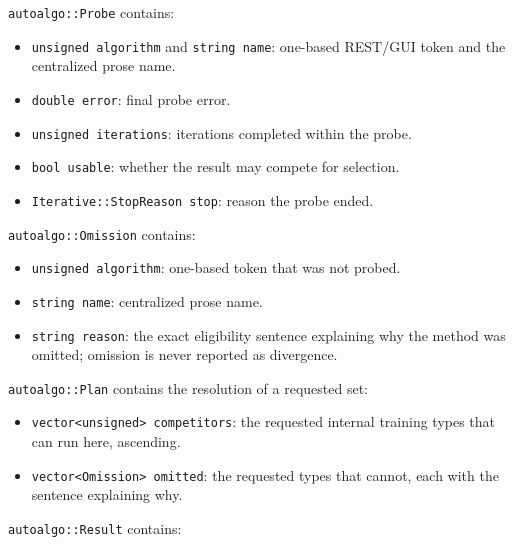 \texttt{autoalgo::Probe} contains:

\begin{itemize}
\item \texttt{unsigned algorithm} and \texttt{string name}: one-based REST/GUI
      token and the centralized prose name.
\item \texttt{double error}: final probe error.
\item \texttt{unsigned iterations}: iterations completed within the probe.
\item \texttt{bool usable}: whether the result may compete for selection.
\item \texttt{Iterative::StopReason stop}: reason the probe ended.
\end{itemize}

\texttt{autoalgo::Omission} contains:

\begin{itemize}
\item \texttt{unsigned algorithm}: one-based token that was not probed.
\item \texttt{string name}: centralized prose name.
\item \texttt{string reason}: the exact eligibility sentence explaining why
      the method was omitted; omission is never reported as divergence.
\end{itemize}

\texttt{autoalgo::Plan} contains the resolution of a requested set:

\begin{itemize}
\item \texttt{vector<unsigned> competitors}: the requested internal training
      types that can run here, ascending.
\item \texttt{vector<Omission> omitted}: the requested types that cannot, each
      with the sentence explaining why.
\end{itemize}

\texttt{autoalgo::Result} contains:


